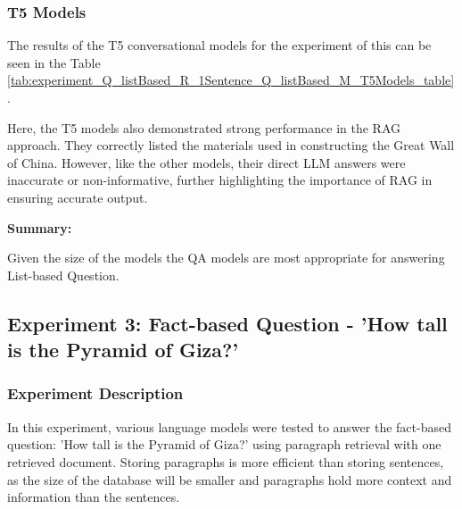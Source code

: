 \documentclass{wseas}
\begin{document}
\subsubsection{T5 Models}


The results of the T5 conversational models for the experiment of this
can be seen in the Table \ref{tab:experiment_Q_listBased_R_1Sentence_Q_listBased_M_T5Models_table}.

Here, the T5 models also demonstrated strong performance in the RAG approach.
They correctly listed the materials used in constructing the Great Wall of
China. However, like the other models, their direct LLM answers were
inaccurate or non-informative, further highlighting the importance of
RAG in ensuring accurate output.

\textbf{Summary:}

Given the size of the models the QA models are most appropriate for
answering List-based Question.


\subsection{Experiment 3: Fact-based Question - 'How tall is the Pyramid of Giza?'}

\subsubsection{Experiment Description}

In this experiment, various language models were tested to answer the
fact-based question: 'How tall is the Pyramid of Giza?' using
paragraph retrieval with one retrieved document. Storing paragraphs is
more efficient than storing sentences, as the size of the database will
be smaller and paragraphs hold more context and information than the
sentences. 
\end{document}
